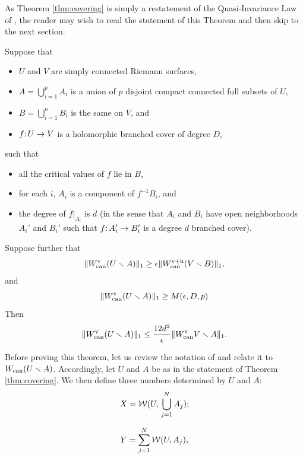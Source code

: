 As Theorem \ref{thm:covering} is simply a restatement of the Quasi-Invariance Law of \cite{covering lemma}, the reader may wish to read the statement of this Theorem and then skip to the next section. 
\begin{theorem} \label{thm:covering}
Suppose that 
\begin{itemize}
\item
$U$ and $V$ are simply connected Riemann surfaces,
\item
$A = \bigcup_{i=1}^p A_i$ is a union of $p$ disjoint compact connected full subsets of $U$,
\item
$B = \bigcup_{i=1}^n B_i$ is the same on $V$,
and 
\item
$f\mathpunct: U\to V$ is a holomorphic branched cover of degree $D$,
\end{itemize}
such that 
\begin{itemize}
\item
all the critical values of $f$ lie in $B$,
\item
for each $i$,
$A_i$ is a component of $f^{-1}B_i$,
and 
\item
the degree of $f|_{A_i}$ is $d$
(in the sense that $A_i$ and $B_i$ have open neighborhoods $A_i'$ and $B_i'$ such that $f\mathpunct: A_i'\to B_i'$ is a degree $d$ branched cover).
\end{itemize}
Suppose further that 
\begin{equation} \label{eq:covering-compare}
\Vert W_{\operatorname{can}}^{\mathrm{v}}(U \smallsetminus A) \Vert_1 \ge \epsilon \Vert W_{\operatorname{can}}^{{\mathrm{v}} + {\mathrm{h}}}(V \smallsetminus B) \Vert_1,
\end{equation}
and 
\begin{equation} \label{eq:covering-large}
\Vert W_{\operatorname{can}}^{\mathrm{v}}(U \smallsetminus A) \Vert_1 \ge M(\epsilon, D, p)
\end{equation}
Then 
\begin{equation} \label{eq:covering-conclude}
\Vert W_{\operatorname{can}}^{\mathrm{v}}(U \smallsetminus A) \Vert_1 \le \frac{12d^2}{\epsilon}\Vert W_{\operatorname{can}}^{\mathrm{v}}{V \smallsetminus A} \Vert_1.
\end{equation}
\end{theorem}

Before proving this theorem,
let us review the notation of \cite{covering lemma} and relate it to $W_{\operatorname{can}}(U \smallsetminus A)$.
Accordingly, 
let $U$ and $A$ be as in the statement of Theorem \ref{thm:covering}.
We then define three numbers determined by $U$ and $A$:
$$
  X = {\mathcal W}(U,\, \bigcup_{j=1}^N A_j);
$$

\begin{equation}\label{Y}
   Y = \sum_{j=1}^N {\mathcal W}(U, A_j),
\end{equation}

